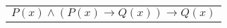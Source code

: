 \documentclass{jarticle}
\begin{document}
\begin{bundle}{\begin{tabular}{c}$P(x) \land (P(x) \to Q(x)) \to Q(x)$\end{tabular}}


\end{bundle}

		
\end{document}
